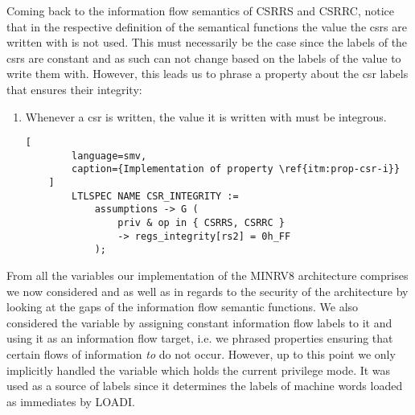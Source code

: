 Coming back to the information flow semantics of CSRRS and CSRRC, notice that in the respective definition of the semantical functions the value the \glspl{csr} are written with is not used.
This must necessarily be the case since the labels of the \glspl{csr} are constant and as such can not change based on the labels of the value to write them with.
However, this leads us to phrase a property about the \gls{csr} labels that ensures their integrity:
\begin{enumerate}[label=\Roman*.,resume]
    \item \label{itm:prop-csr-i}
    Whenever a \gls{csr} is written, the value it is written with must be integrous.

    \begin{lstlisting}[
        language=smv,
        caption={Implementation of property \ref{itm:prop-csr-i}}
    ]
        LTLSPEC NAME CSR_INTEGRITY :=
            assumptions -> G (
                priv & op in { CSRRS, CSRRC }
                -> regs_integrity[rs2] = 0h_FF
            );
    \end{lstlisting}
\end{enumerate}

From all the variables our implementation of the MINRV8 architecture comprises we now considered  and  as well as  in regards to the security of the architecture by looking at the gaps of the information flow semantic functions.
We also considered the variable  by assigning constant information flow labels to it and using it as an information flow target, i.e. we phrased properties ensuring that certain flows of information \textit{to}  do not occur.
However, up to this point we only implicitly handled the  variable which holds the current privilege mode.
It was used as a source of labels since it determines the labels of machine words loaded as immediates by LOADI.

